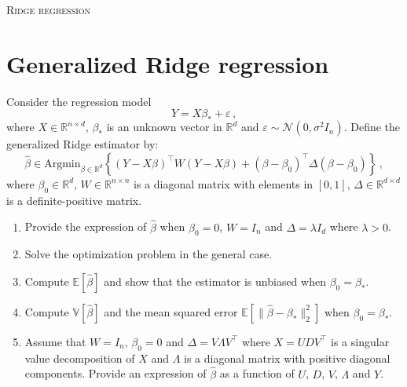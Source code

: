 \documentclass[a4paper,10pt,fleqn]{article}
\newcommand{\rset}{\ensuremath{\mathbb{R}}}
\newcommand{\1}{\ensuremath{\mathbbm{1}}}
\begin{document}

\noindent\hrulefill

\begin{center}
\textsc{Ridge regression}
\end{center}
\hrulefill

\medskip


\section*{Generalized Ridge regression}
Consider the regression model
$$
Y = X\beta_* + \varepsilon\,,
$$
where $X\in\mathbb{R}^{n\times d}$, $\beta_*$ is an unknown vector in $\mathbb{R}^{d}$ and $\varepsilon\sim \mathcal{N}(0,\sigma^2 I_n)$.
Define the generalized Ridge estimator by:
$$
\widehat{\beta} \in \mathrm{Argmin}_{\beta\in \mathbb{R}^{d}} \left\{(Y -X\beta)^\top W (Y-X\beta) + (\beta-\beta_0)^\top \Delta (\beta-\beta_0)\right\}\,,
$$
where $\beta_0 \in \mathbb{R}^{d}$, $W\in\rset^{n\times n}$ is a diagonal matrix with elements in $[0,1]$, $\Delta\in\rset^{d\times d}$ is a definite-positive matrix.
\begin{enumerate}
\item Provide the expression of $\widehat \beta$ when $\beta_0 = 0$, $W = I_n$ and $\Delta = \lambda I_d$ where $\lambda>0$.
\item Solve the optimization problem in the general case.
\item Compute $\mathbb{E}[\widehat \beta]$ and show that the estimator is unbiased when $\beta_0 = \beta_*$.
\item Compute $\mathbb{V}[\widehat \beta]$ and the mean squared error $\mathbb{E}[\|\widehat \beta-\beta_*\|_2^2]$ when $\beta_0 = \beta_*$.
\item Assume that $W=I_n$, $\beta_0=0$ and $\Delta = V\Lambda 
 V^\top$ where $X = U D V^\top$ is a singular value decomposition of $X$ and $\Lambda$ is a diagonal matrix with positive diagonal components. Provide an expression of $\widehat \beta$ as a function of $U$, $D$, $V$, $\Lambda$ and $Y$.
\end{enumerate}
\end{document}
